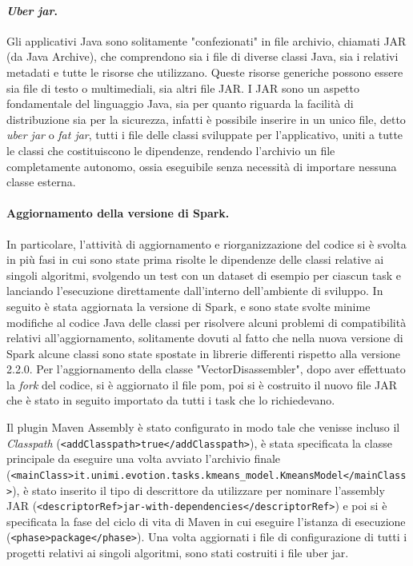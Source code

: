 \documentclass[12pt,a4paper,fleqn,titlepage]{report}
\begin{document}
        \paragraph{\emph{Uber jar}.}
        Gli applicativi Java sono solitamente "confezionati" in file archivio, chiamati JAR (da Java Archive), che comprendono sia i file di diverse classi Java, sia i relativi metadati e tutte le risorse che utilizzano. Queste risorse generiche possono essere sia file di testo o multimediali, sia altri file JAR.
        I JAR sono un aspetto fondamentale del linguaggio Java, sia per quanto riguarda la facilità di distribuzione sia per la sicurezza, infatti è possibile inserire in un unico file, detto \emph{uber jar} o \emph{fat jar}, tutti i file delle classi sviluppate per l'applicativo, uniti a tutte le classi che costituiscono le dipendenze, rendendo l'archivio un file completamente autonomo, ossia eseguibile senza necessità di importare nessuna classe esterna.

        \paragraph{Aggiornamento della versione di Spark.}
        In particolare, l'attività di aggiornamento e riorganizzazione del codice si è svolta in più fasi in cui sono state prima risolte le dipendenze delle classi relative ai singoli algoritmi, svolgendo un test con un dataset di esempio per ciascun task e lanciando l'esecuzione direttamente dall'interno dell'ambiente di sviluppo. In seguito è stata aggiornata la versione di Spark, e sono state svolte minime modifiche al codice Java delle classi per risolvere alcuni problemi di compatibilità relativi all'aggiornamento, solitamente dovuti al fatto che nella nuova versione di Spark alcune classi sono state spostate in librerie differenti rispetto alla versione 2.2.0. Per l'aggiornamento della classe "VectorDisassembler", dopo aver effettuato la \emph{fork} del codice, si è aggiornato il file \gls{pom}, poi si è costruito il nuovo file JAR che è stato in seguito importato da tutti i task che lo richiedevano.

        Il plugin Maven Assembly è stato configurato in modo tale che venisse incluso il \emph{Classpath} (\lstinline{<addClasspath>true</addClasspath>}), è stata specificata la classe principale da eseguire una volta avviato l'archivio finale (\lstinline{<mainClass>it.unimi.evotion.tasks.kmeans_model.KmeansModel</mainClass>}), è stato inserito il tipo di descrittore da utilizzare per nominare l'assembly JAR (\lstinline{<descriptorRef>jar-with-dependencies</descriptorRef>}) e poi si è specificata la fase del ciclo di vita di Maven in cui eseguire l'istanza di esecuzione (\lstinline{<phase>package</phase>}). Una volta aggiornati i file di configurazione di tutti i progetti relativi ai singoli algoritmi, sono stati costruiti i file uber jar.
\end{document}
